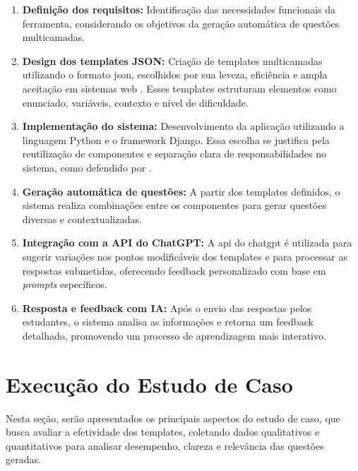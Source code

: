 \begin{enumerate}[label=\textbf{\arabic*)}]
    \item \textbf{Definição dos requisitos:} Identificação das necessidades funcionais da ferramenta, considerando os objetivos da geração automática de questões multicamadas.

    \item \textbf{Design dos templates JSON:} Criação de templates multicamadas utilizando o formato \gls{json}, escolhidos por sua leveza, eficiência e ampla aceitação em sistemas web \parencite{goyal2017, wang2011}. Esses templates estruturam elementos como enunciado, variáveis, contexto e nível de dificuldade.

    \item \textbf{Implementação do sistema:} Desenvolvimento da aplicação utilizando a linguagem Python e o framework Django. Essa escolha se justifica pela reutilização de componentes e separação clara de responsabilidades no sistema, como defendido por \parencite{rubio2017}.

    \item \textbf{Geração automática de questões:} A partir dos templates definidos, o sistema realiza combinações entre os componentes para gerar questões diversas e contextualizadas.

    \item \textbf{Integração com a API do ChatGPT:} A \gls{api} do \gls{chatgpt} é utilizada para sugerir variações nos pontos modificáveis dos templates e para processar as respostas submetidas, oferecendo feedback personalizado com base em \textit{prompts} específicos.

    \item \textbf{Resposta e feedback com IA:} Após o envio das respostas pelos estudantes, o sistema analisa as informações e retorna um feedback detalhado, promovendo um processo de aprendizagem mais interativo.
\end{enumerate}


\section{Execução do Estudo de Caso}

Nesta seção, serão apresentados os principais aspectos do estudo de caso, que busca avaliar a efetividade dos templates, coletando dados qualitativos e quantitativos para analisar desempenho, clareza e relevância das questões geradas. 


